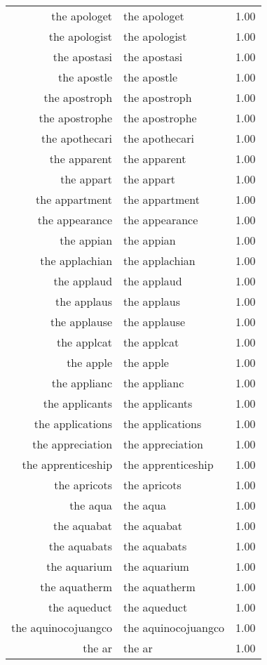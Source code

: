 \begin{table}[ht]
\begin{tabular}{rlr}
  the apologet & the apologet & 1.00 \\ 
  the apologist & the apologist & 1.00 \\ 
  the apostasi & the apostasi & 1.00 \\ 
  the apostle & the apostle & 1.00 \\ 
  the apostroph & the apostroph & 1.00 \\ 
  the apostrophe & the apostrophe & 1.00 \\ 
  the apothecari & the apothecari & 1.00 \\ 
  the apparent & the apparent & 1.00 \\ 
  the appart & the appart & 1.00 \\ 
  the appartment & the appartment & 1.00 \\ 
  the appearance & the appearance & 1.00 \\ 
  the appian & the appian & 1.00 \\ 
  the applachian & the applachian & 1.00 \\ 
  the applaud & the applaud & 1.00 \\ 
  the applaus & the applaus & 1.00 \\ 
  the applause & the applause & 1.00 \\ 
  the applcat & the applcat & 1.00 \\ 
  the apple & the apple & 1.00 \\ 
  the applianc & the applianc & 1.00 \\ 
  the applicants & the applicants & 1.00 \\ 
  the applications & the applications & 1.00 \\ 
  the appreciation & the appreciation & 1.00 \\ 
  the apprenticeship & the apprenticeship & 1.00 \\ 
  the apricots & the apricots & 1.00 \\ 
  the aqua & the aqua & 1.00 \\ 
  the aquabat & the aquabat & 1.00 \\ 
  the aquabats & the aquabats & 1.00 \\ 
  the aquarium & the aquarium & 1.00 \\ 
  the aquatherm & the aquatherm & 1.00 \\ 
  the aqueduct & the aqueduct & 1.00 \\ 
  the aquinocojuangco & the aquinocojuangco & 1.00 \\ 
  the ar & the ar & 1.00 \\ 

\end{tabular}
\end{table}
